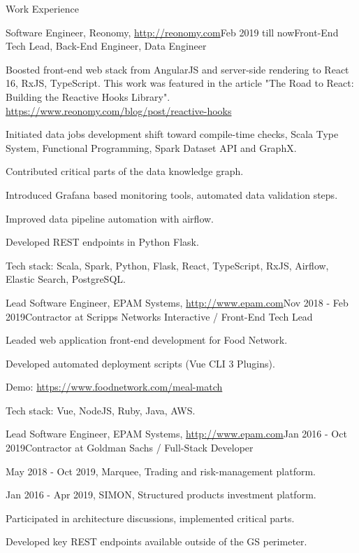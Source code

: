 \documentclass{resume}
\begin{document}
\begin{rSection}{Work Experience}

\begin{rSubsection}{Software Engineer, Reonomy, \url{http://reonomy.com}}{Feb 2019 till now}{Front-End Tech Lead, Back-End Engineer, Data Engineer}{}
\item Boosted front-end web stack from AngularJS and server-side rendering to React 16, RxJS, TypeScript.
This work was featured in the article "The Road to React: Building the Reactive Hooks Library".
\url{https://www.reonomy.com/blog/post/reactive-hooks}
\item Initiated data jobs development shift toward compile-time checks, 
Scala Type System, Functional Programming, Spark Dataset API and GraphX.
\item Contributed critical parts of the data knowledge graph.
\item Introduced Grafana based monitoring tools, automated data validation steps.
\item Improved data pipeline automation with airflow.
\item Developed REST endpoints in Python Flask.

Tech stack: Scala, Spark, Python, Flask, React, TypeScript, RxJS, Airflow, Elastic Search, PostgreSQL.
\end{rSubsection}

\begin{rSubsection}{Lead Software Engineer, EPAM Systems, \url{http://www.epam.com}}{Nov 2018 - Feb 2019}{Contractor at Scripps Networks Interactive / Front-End Tech Lead}{}
\item Leaded web application front-end development for Food Network.
\item Developed automated deployment scripts (Vue CLI 3 Plugins).

Demo: \url{https://www.foodnetwork.com/meal-match}

Tech stack: Vue, NodeJS, Ruby, Java, AWS.
\end{rSubsection}

\begin{rSubsection}{Lead Software Engineer, EPAM Systems, \url{http://www.epam.com}}{Jan 2016 - Oct 2019}{Contractor at Goldman Sachs / Full-Stack Developer}{}
\item May 2018 - Oct 2019, Marquee, Trading and risk-management platform.
\item Jan 2016 - Apr 2019, SIMON, Structured products investment platform.
\item Participated in architecture discussions, implemented critical parts.
\item Developed key REST endpoints available outside of the GS perimeter.


\end{rSubsection}
\end{rSection}
\end{document}
